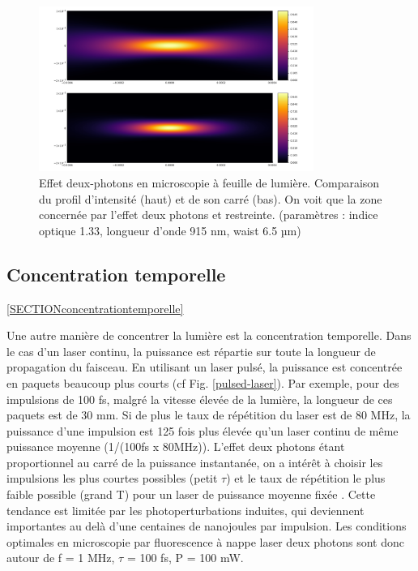 
\begin{figure}
\centering
\includegraphics[width=0.8\textwidth]{./files/profile-intensity.png}
\caption{Effet deux-photons en microscopie à feuille de lumière. Comparaison du profil d'intensité (haut) et de son carré (bas). On voit que la zone concernée par l'effet deux photons et restreinte. (paramètres : indice optique 1.33, longueur d'onde 915 nm, waist 6.5 µm)
}
\label{2P-intensity-profile}
\end{figure}

\subsection{Concentration temporelle}\ref{SECTIONconcentrationtemporelle}

Une autre manière de concentrer la lumière est la concentration temporelle. Dans le cas d'un laser continu, la puissance est répartie sur toute la longueur de propagation du faisceau. En utilisant un laser pulsé, la puissance est concentrée en paquets beaucoup plus courts (cf Fig. \ref{pulsed-laser}). Par exemple, pour des impulsions de 100 fs, malgré la vitesse élevée de la lumière, la longueur de ces paquets est de 30 mm. Si de plus le taux de répétition du laser est de 80 MHz, la puissance d'une impulsion est 125 fois plus élevée qu'un laser continu de même puissance moyenne (1/(100fs x 80MHz)). L'effet deux photons étant proportionnel au carré de la puissance instantanée, on a intérêt à choisir les impulsions les plus courtes possibles (petit $\tau$) et le taux de répétition le plus faible possible (grand T) pour un laser de puissance moyenne fixée \cite{maioli_fast_2020}. Cette tendance est limitée par les photoperturbations induites, qui deviennent importantes au delà d'une centaines de nanojoules par impulsion. Les conditions optimales en microscopie par fluorescence à nappe laser deux photons sont donc autour de f = 1 MHz, $\tau$ = 100 fs, P = 100 mW.

